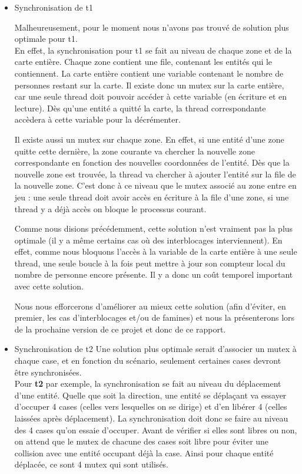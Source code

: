 \documentclass[11pt]{article} %
\begin{document}
\begin{itemize}
	\item{Synchronisation de t1}

Malheureusement, pour le moment nous n'avons pas trouvé de solution plus optimale pour t1. \\
En effet, la synchronisation pour t1 se fait au niveau de chaque zone et de la carte entière. Chaque zone contient une file, contenant les entités qui le contiennent. 
La carte entière contient une variable contenant le nombre de personnes restant sur la carte. Il existe donc un mutex sur la carte entière, car une seule thread doit pouvoir accéder à cette variable (en écriture et en lecture).
Dès qu'une entité a quitté la carte, la thread correspondante accèdera à cette variable pour la décrémenter.

Il existe aussi un mutex sur chaque zone. En effet, si une entité d'une zone quitte cette dernière,  la zone courante va chercher la nouvelle zone correspondante en fonction des nouvelles coordonnées de l'entité. Dès que la nouvelle zone est trouvée, la thread va chercher à ajouter l'entité sur la file de la nouvelle zone. C'est donc à ce niveau que le mutex associé au zone entre en jeu : une seule thread doit avoir accès en écriture à la file d'une zone, si une thread y a déjà accès on bloque le processus courant.

Comme nous disions précédemment, cette solution n'est vraiment pas la plus optimale (il y a même certains cas où des interblocages interviennent). En effet, comme nous bloquons l'accès à la variable de la carte entière à une seule thread, une seule boucle à la fois peut mettre à jour son compteur local du nombre de personne encore présente. Il y a donc un coût temporel important avec cette solution.


Nous nous efforcerons d'améliorer au mieux cette solution (afin d'éviter, en premier, les cas d'interblocages et/ou de famines) et nous la présenterons lors de la prochaine version de ce projet et donc de ce rapport.


	\item{Synchronisation de t2}
Une solution plus optimale serait d'associer un mutex à chaque case, et en fonction du scénario, seulement certaines cases devront être synchronisées. \\



Pour \textbf{t2} par exemple, la synchronisation se fait au niveau du déplacement d'une entité. Quelle que soit la direction, une entité se déplaçant va essayer d'occuper 4 cases (celles vers lesquelles on se dirige) et d'en libérer 4 (celles laissées après déplacement). La synchronisation doit donc se faire au niveau des 4 cases qu'on essaie d'occuper. Avant de vérifier si elles sont libres ou non, on attend que le mutex de chacune des cases soit libre pour éviter une collision avec une entité occupant déjà la case. Ainsi pour chaque entité déplacée, ce sont 4 mutex qui sont utilisés.

\end {itemize}
\end{document}
